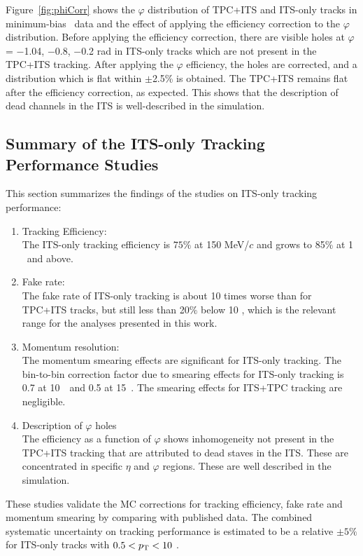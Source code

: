 Figure~\ref{fig:phiCorr} shows the $\varphi$ distribution of TPC+ITS and ITS-only tracks in minimum-bias \pPb~data and the effect of applying the efficiency correction to the $\varphi$ distribution. Before applying the efficiency correction, there are visible holes at $\varphi$ = $-$1.04, $-$0.8, $-$0.2 rad in ITS-only tracks which are not present in the TPC+ITS tracking. After applying the $\varphi$ efficiency, the holes are corrected, and a distribution which is flat within {$\pm$2.5\%} is obtained. The TPC+ITS remains flat after the efficiency correction, as expected. This shows that the description of dead channels in the ITS is well-described in the simulation. 


\subsection{Summary of the ITS-only Tracking Performance Studies} 
\label{sec:sys_tracking}
This section summarizes the findings of the studies on ITS-only tracking performance: 
\begin{enumerate}
\item Tracking Efficiency: \\
The ITS-only tracking efficiency is $75\%$ at 150 MeV/$c$ and grows to 85$\%$ at 1 \GeVc~and above. 
\item Fake rate:\\
The fake rate of ITS-only tracking is about 10 times worse than for TPC+ITS tracks, but still less than 20$\%$ below 10 \GeVc, which is the relevant range for the analyses presented in this work.
\item Momentum resolution:\\
The momentum smearing effects are significant for ITS-only tracking. The bin-to-bin correction factor due to smearing effects for ITS-only tracking is 0.7 at 10~\GeVc~and 0.5 at 15~\GeVc. The smearing effects for ITS+TPC tracking are negligible.
\item Description of $\varphi$ holes\\
The efficiency as a function of $\varphi$ shows inhomogeneity not present in the TPC+ITS tracking that are attributed to dead staves in the ITS. These are concentrated in specific $\eta$ and $\varphi$ regions. These are well described in the simulation. 
\end{enumerate}

These studies validate the MC corrections for tracking efficiency, fake rate and momentum smearing by comparing with published data. The combined systematic uncertainty on tracking performance is estimated to be a relative $\pm 5\%$ for ITS-only tracks with $0.5 < p_{\mathrm{T}} < 10$ \GeVc. 

